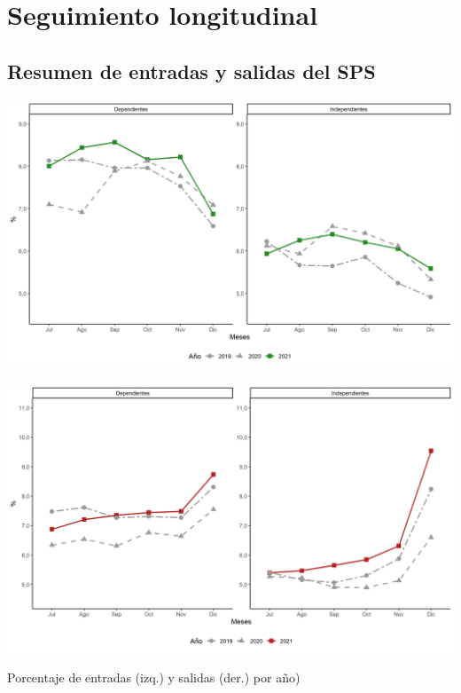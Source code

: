 \section{Seguimiento longitudinal}

\subsection{Resumen de entradas y salidas del SPS}

\begin{table}[!htbp]
\centering
\begin{minipage}{0.5\textwidth}
  \centering
  \includegraphics[width=\linewidth]{figures/02_longitudinal/entradas_anual_dependiente_independiente.png}
\end{minipage}%
\begin{minipage}{0.5\textwidth}
  \centering
  \includegraphics[width=\linewidth]{figures/02_longitudinal/salidas_anual_dependiente_independiente.png}
\end{minipage}
\caption{Porcentaje de entradas (izq.) y salidas (der.) por año)}
\label{tabla:dependientes:entradas_salidas}
\end{table}

